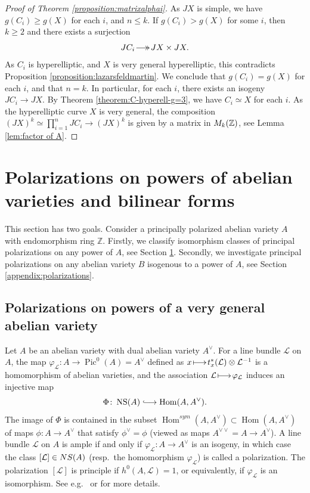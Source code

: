 \documentclass[a4paper,11pt,reqno]{amsart}
\makeatletter
\newcommand*{\longhookrightarrow}{\ensuremath{\lhook\joinrel\relbar\joinrel\rightarrow}}
\numberwithin{equation}{section}
\theoremstyle{plain}
\theoremstyle{definition}
\newcommand{\Z}{\mathbb Z}
\let\rm\relax
\newcommand{\rm}[1]{{\mathrm{#1}}}
\newcommand{\Hom}{\operatorname{Hom}}
\newcommand{\Pic}{\operatorname{Pic}}
\newcommand{\NS}{\operatorname{NS}}
\newcommand{\ca}[1]{{\mathcal{#1}}}
\renewcommand{\mapsto}{\xymatrix@1@=15pt{\ar@{|->}[r]&}}
\renewcommand{\twoheadrightarrow}{\xymatrix@1@=15pt{\ar@{->>}[r]&}}
\renewcommand{\cong}{\simeq}
\makeatother
\begin{document}
\begin{proof}[Proof of Theorem \ref{proposition:matrixalphai}] 
As $J X$ is simple, we have $g(C_i) \geq g(X)$ for each $i$, and $n \leq k$. If $g(C_i) > g(X)$ for some $i$, then $k \geq 2$ and there exists a surjection
\[
JC_i \twoheadrightarrow JX \times J X. 
\] 
As $C_i$ is hyperelliptic, and $X$ is very general hyperelliptic, this contradicts Proposition \ref{proposition:lazarsfeldmartin}. We conclude that $g(C_i) = g(X)$ for each $i$, and that $n = k$. In particular, for each $i$, there exists an isogeny
$
J C_i \to J X.
$
By Theorem \ref{theorem:C-hyperell-g=3}, we have $C_i \cong X$ for each $i$. As the hyperelliptic curve $X$ is very general, the composition $(J X)^k \cong \prod_{i = 1}^n J C_i \to (J X)^k$ is given by a matrix in $ \rm{M}_k(\Z)$, see Lemma \ref{lem:factor of A}. 
\end{proof} 

\section{Polarizations on powers of abelian varieties and bilinear forms} \label{subsection:polarizations-on-powers}

This section has two goals. 
Consider a principally polarized abelian variety $A$ with endomorphism ring $\Z$. 
Firstly, we classify isomorphism classes of principal polarizations on any power of $A$, see Section \ref{subsection:polarizations-on-powers}. Secondly, we investigate principal polarizations on any abelian variety $B$ isogenous to a power of $A$, see Section \ref{appendix:polarizations}.  

 \subsection{Polarizations on powers of a very general abelian variety} 
 \label{subsubsection:polarizations-on-powers}

Let $A$ be an abelian variety with dual abelian variety $A^\vee$. For a line bundle $\ca L$ on $A$, the map $\varphi_{\ca L} \colon A \to \Pic^0(A) = A^\vee$ defined as $x \mapsto t_x^\ast(\ca L) \otimes \ca L^{-1}$ is a homomorphism of abelian varieties, and the association $\ca L \mapsto \varphi_{\ca L}$ induces an injective map 
$$
\Phi\colon \NS(A) \longhookrightarrow \Hom(A, A^\vee).
$$  
The image of $\Phi$ is contained in the subset $\Hom^{sym}(A, A^\vee) \subset \Hom(A, A^\vee)$ of maps $\phi \colon A \to A^\vee$ that satisfy $\phi^\vee = \phi $ (viewed as maps $ A^{\vee\vee} = A \to A^\vee$). 
A line bundle $\ca L$ on $A$ is ample if and only if $\varphi_{\ca L} \colon A \to A^\vee$ is an isogeny, in which case the class $[\ca L] \in \rm{NS}(A)$ (resp.\ the homomorphism $\varphi_{\ca L}$) is called a polarization.
The polarization $[\ca L]$ is principle if $h^0(A, \ca L) = 1$, or equivalently, if  $\varphi_{\ca L}$ is an isomorphism. See e.g.\ \cite{Milne1986} or \cite{birkenhakelange-complexAVs} for more details. 
\end{document}
